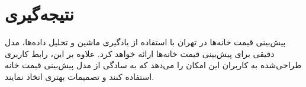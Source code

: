 \documentclass{article}
\begin{document}
\section{نتیجه‌گیری}
پیش‌بینی قیمت خانه‌ها در تهران با استفاده از یادگیری ماشین و تحلیل داده‌ها، مدل دقیقی برای پیش‌بینی قیمت خانه‌ها ارائه خواهد کرد. علاوه بر این، رابط کاربری طراحی‌شده به کاربران این امکان را می‌دهد که به سادگی از مدل پیش‌بینی قیمت خانه استفاده کنند و تصمیمات بهتری اتخاذ نمایند.
\end{document}
